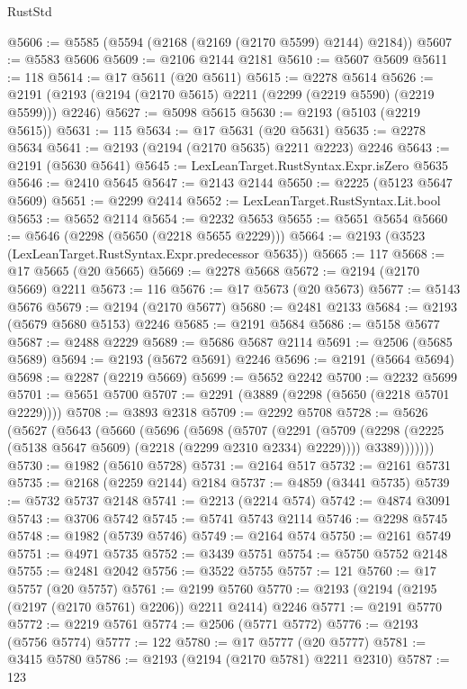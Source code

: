 \begin{lexlean}{RustStd}
\begin{coremodule}
@5606 := @5585 (@5594 (@2168 (@2169 (@2170 @5599) @2144) @2184))
@5607 := @5583 @5606
@5609 := @2106 @2144 @2181
@5610 := @5607 @5609
@5611 := 118
@5614 := @17 @5611 (@20 @5611)
@5615 := @2278 @5614
@5626 := @2191 (@2193 (@2194 (@2170 @5615) @2211 (@2299 (@2219 @5590) (@2219 @5599))) @2246)
@5627 := @5098 @5615
@5630 := @2193 (@5103 (@2219 @5615))
@5631 := 115
@5634 := @17 @5631 (@20 @5631)
@5635 := @2278 @5634
@5641 := @2193 (@2194 (@2170 @5635) @2211 @2223) @2246
@5643 := @2191 (@5630 @5641)
@5645 := LexLeanTarget.RustSyntax.Expr.isZero @5635
@5646 := @2410 @5645
@5647 := @2143 @2144
@5650 := @2225 (@5123 @5647 @5609)
@5651 := @2299 @2414
@5652 := LexLeanTarget.RustSyntax.Lit.bool
@5653 := @5652 @2114
@5654 := @2232 @5653
@5655 := @5651 @5654
@5660 := @5646 (@2298 (@5650 (@2218 @5655 @2229)))
@5664 := @2193 (@3523 (LexLeanTarget.RustSyntax.Expr.predecessor @5635))
@5665 := 117
@5668 := @17 @5665 (@20 @5665)
@5669 := @2278 @5668
@5672 := @2194 (@2170 @5669) @2211
@5673 := 116
@5676 := @17 @5673 (@20 @5673)
@5677 := @5143 @5676
@5679 := @2194 (@2170 @5677)
@5680 := @2481 @2133
@5684 := @2193 (@5679 @5680 @5153) @2246
@5685 := @2191 @5684
@5686 := @5158 @5677
@5687 := @2488 @2229
@5689 := @5686 @5687 @2114
@5691 := @2506 (@5685 @5689)
@5694 := @2193 (@5672 @5691) @2246
@5696 := @2191 (@5664 @5694)
@5698 := @2287 (@2219 @5669)
@5699 := @5652 @2242
@5700 := @2232 @5699
@5701 := @5651 @5700
@5707 := @2291 (@3889 (@2298 (@5650 (@2218 @5701 @2229))))
@5708 := @3893 @2318
@5709 := @2292 @5708
@5728 := @5626
    (@5627
      (@5643
        (@5660
          (@5696
            (@5698
              (@5707
                (@2291
                  (@5709 (@2298 (@2225 (@5138 @5647 @5609) (@2218 (@2299 @2310 @2334) @2229))))
                  @3389)))))))
@5730 := @1982 (@5610 @5728)
@5731 := @2164 @517
@5732 := @2161 @5731
@5735 := @2168 (@2259 @2144) @2184
@5737 := @4859 (@3441 @5735)
@5739 := @5732 @5737 @2148
@5741 := @2213 (@2214 @574)
@5742 := @4874 @3091
@5743 := @3706 @5742
@5745 := @5741 @5743 @2114
@5746 := @2298 @5745
@5748 := @1982 (@5739 @5746)
@5749 := @2164 @574
@5750 := @2161 @5749
@5751 := @4971 @5735
@5752 := @3439 @5751
@5754 := @5750 @5752 @2148
@5755 := @2481 @2042
@5756 := @3522 @5755
@5757 := 121
@5760 := @17 @5757 (@20 @5757)
@5761 := @2199 @5760
@5770 := @2193 (@2194 (@2195 (@2197 (@2170 @5761) @2206)) @2211 @2414) @2246
@5771 := @2191 @5770
@5772 := @2219 @5761
@5774 := @2506 (@5771 @5772)
@5776 := @2193 (@5756 @5774)
@5777 := 122
@5780 := @17 @5777 (@20 @5777)
@5781 := @3415 @5780
@5786 := @2193 (@2194 (@2170 @5781) @2211 @2310)
@5787 := 123

\end{coremodule}
\end{lexlean}
